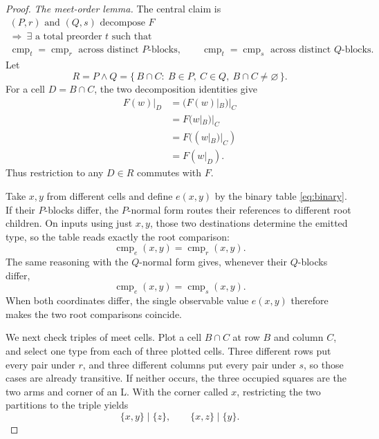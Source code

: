 \documentclass[11pt]{article}
\theoremstyle{definition}
\newcommand{\cmp}{\operatorname{cmp}}
\begin{document}
\begin{proof}
\medskip
\noindent\textit{The meet-order lemma.}
The central claim is
\begin{equation}
\boxed{
\begin{gathered}
 (P,r)\text{ and }(Q,s)\text{ decompose }F\\
 \Longrightarrow\ \exists\text{ a total preorder }t\text{ such that}\\
 \cmp_t=\cmp_r\text{ across distinct }P\text{-blocks},\qquad
 \cmp_t=\cmp_s\text{ across distinct }Q\text{-blocks}.
\end{gathered}}
\tag{7}\label{eq:meet-order}
\end{equation}
Let
\[
  R=P\wedge Q
  =
  \{\,B\cap C:\ B\in P,\ C\in Q,\ B\cap C\ne\varnothing\,\}.
\]
For a cell \(D=B\cap C\), the two decomposition identities give
\begin{equation}
\begin{aligned}
 F(w)|_D
 &= (F(w)|_B)|_C                                      \\
 &= F(w|_B)|_C                                         \\
 &= F((w|_B)|_C)                                       \\
 &= F(w|_D).
\end{aligned}
\tag{8}\label{eq:cell-autonomy}
\end{equation}
Thus restriction to any \(D\in R\) commutes with \(F\).

Take \(x,y\) from different cells and define \(e(x,y)\) by the binary table
\eqref{eq:binary}.  If their \(P\)-blocks differ, the \(P\)-normal form
routes their references to different root children.  On inputs using just
\(x,y\), those two destinations determine the emitted type, so the table
reads exactly the root comparison:
\begin{equation}
  \cmp_e(x,y)=\cmp_r(x,y).
  \tag{9}\label{eq:e-r}
\end{equation}
The same reasoning with the \(Q\)-normal form gives, whenever their
\(Q\)-blocks differ,
\begin{equation}
  \cmp_e(x,y)=\cmp_s(x,y).
  \tag{10}\label{eq:e-s}
\end{equation}
When both coordinates differ, the single observable value \(e(x,y)\)
therefore makes the two root comparisons coincide.

We next check triples of meet cells.  Plot a cell \(B\cap C\) at row \(B\)
and column \(C\), and select one type from each of three plotted cells.
Three different rows put every pair under \(r\), and three different
columns put every pair under \(s\), so those cases are already transitive.
If neither occurs, the three occupied squares are the two arms and corner
of an L.  With the corner called \(x\), restricting the two partitions to
the triple yields
\begin{equation}
  \{x,y\}\mid\{z\},
  \qquad
  \{x,z\}\mid\{y\}.
  \tag{11}\label{eq:L}
\end{equation}


\end{proof}
\end{document}
